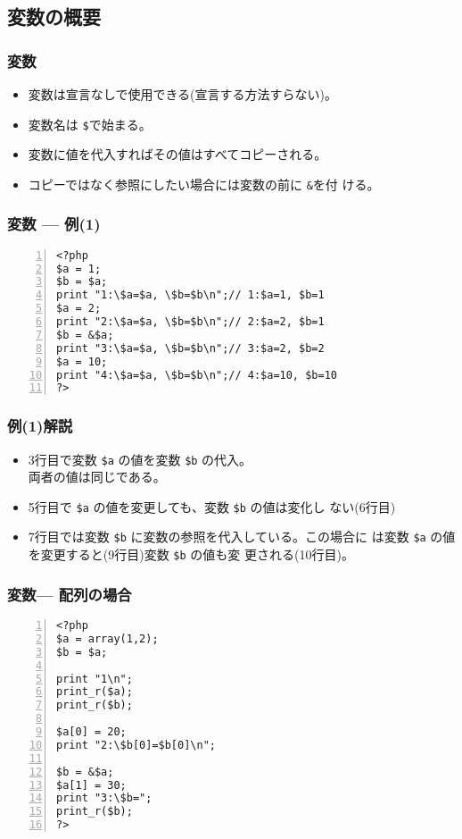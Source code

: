\subsection{変数の概要}
\begin{frame}[containsverbatim]
\frametitle{変数}
\begin{itemize}
 \item 変数は宣言なしで使用できる(宣言する方法すらない)。
  \item 変数名は \texttt{\$}で始まる。
  \item 変数に値を代入すればその値はすべてコピーされる。
  \item コピーではなく参照にしたい場合には変数の前に \texttt{\&}を付
ける。
 \end{itemize}
\end{frame}
\begin{frame}[containsverbatim]
\frametitle{変数 --- 例(1)}
\begin{Verbatim}[numbers=left]
<?php
$a = 1;
$b = $a;
print "1:\$a=$a, \$b=$b\n";// 1:$a=1, $b=1
$a = 2;
print "2:\$a=$a, \$b=$b\n";// 2:$a=2, $b=1
$b = &$a;
print "3:\$a=$a, \$b=$b\n";// 3:$a=2, $b=2
$a = 10;
print "4:\$a=$a, \$b=$b\n";// 4:$a=10, $b=10
?>
\end{Verbatim}
\end{frame}
\begin{frame}[containsverbatim]
 \frametitle{例(1)解説}
 \begin{itemize}
  \item 3行目で変数 \verb+$a+ の値を変数 \verb+$b+ の代入。\\
        両者の値は同じである。
  \item 5行目で \verb+$a+ の値を変更しても、変数 \verb+$b+ の値は変化し
        ない(6行目)
  \item 7行目では変数 \verb+$b+ に変数の参照を代入している。この場合に
        は変数 \verb+$a+ の値を変更すると(9行目)変数 \verb+$b+ の値も変
        更される(10行目)。
 \end{itemize}
\end{frame}
\begin{frame}[containsverbatim]
 \frametitle{変数--- 配列の場合}

\begin{Verbatim}[numbers=left]
<?php
$a = array(1,2);
$b = $a;

print "1\n";
print_r($a);
print_r($b);

$a[0] = 20;
print "2:\$b[0]=$b[0]\n";

$b = &$a;
$a[1] = 30;
print "3:\$b=";
print_r($b);
?>
\end{Verbatim}
\end{frame}
